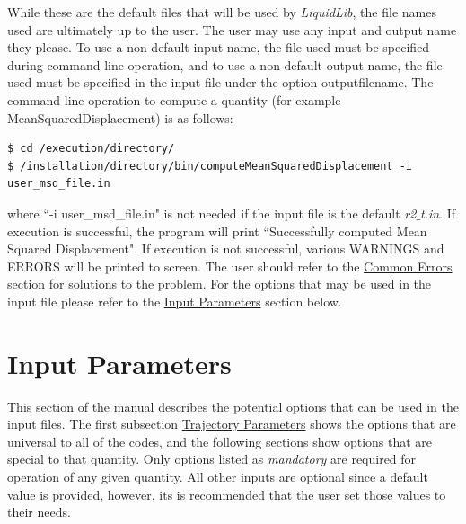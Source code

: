 \documentclass{article}
\begin{document}
\noindent While these are the default files that will be used by \textit{LiquidLib}, the file names used are ultimately up to the user.  The user may use any input and output name they please.  To use a non-default input name, the file used must be specified during command line operation, and to use a non-default output name, the file used must be specified in the input file under the option outputfilename.  The command line operation to compute a quantity (for example MeanSquaredDisplacement) is as follows:  
\begin{lstlisting}[style=BashInputStyle]
$ cd /execution/directory/
$ /installation/directory/bin/computeMeanSquaredDisplacement -i user_msd_file.in
\end{lstlisting}
where ``-i user\_msd\_file.in" is not needed if the input file is the default \textit{r2$\_$t.in}.  If execution is successful, the program will print ``Successfully computed Mean Squared Displacement".  If execution is not successful, various WARNINGS and ERRORS will be printed to screen. The user should refer to the \hyperref[sec::errors]{Common Errors} section for solutions to the problem.  For the options that may be used in the input file please refer to the \hyperref[sec::parameters]{Input Parameters}  section below.

\section{Input Parameters} \label{sec::parameters}
This section of the manual describes the potential options that can be used in the input files.  The first subsection \hyperref[sec::general_parameters]{Trajectory Parameters} shows the options that are universal to all of the codes, and the following sections show options that are special to that quantity.  Only options listed as \textit{mandatory} are required for operation of any given quantity.  All other inputs are optional since a default value is provided, however, its is recommended that the user set those values to their needs.
\end{document}
